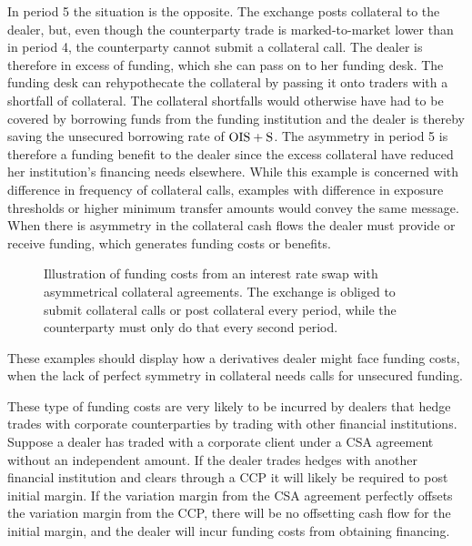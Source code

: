 \documentclass[main.tex]{subfiles}
\begin{document}
\begin{example}
        In period 5 the situation is the opposite.
        The exchange posts collateral to the dealer, 
        but, even though the counterparty trade is marked-to-market lower than in period 4,
        the counterparty cannot submit a collateral call. 
        The dealer is therefore in excess of funding,
        which she can pass on to her funding desk.
        The funding desk can rehypothecate the collateral
        by passing it onto traders with a shortfall of collateral.
        The collateral shortfalls would otherwise have had to be covered by borrowing funds 
        from the funding institution and the dealer is thereby saving the unsecured borrowing rate of $\OIS/ + \text{S}$.
        The asymmetry in period 5 is therefore a funding benefit to the dealer
        since the excess collateral have reduced her institution's financing needs elsewhere.
        While this example is concerned with difference in frequency of collateral calls,
        examples with difference in exposure thresholds or higher minimum transfer amounts 
        would convey the same message.
        When there is asymmetry in the collateral cash flows the dealer must provide or receive funding,
        which generates funding costs or benefits.
        \end{example}

        \begin{figure}
            \centering
            \resizebox{\textwidth}{!}{%
            \begin{tikzpicture}
                
            \end{tikzpicture}        
            }   
            \caption{
                Illustration of funding costs from an interest rate swap with asymmetrical collateral agreements.
                The exchange is obliged to submit collateral calls or post collateral every period,
                while the counterparty must only do that every second period.
            }
            \label{fig:funding-costs-asymmetrical-csa}
        \end{figure}

        These examples should display how a derivatives dealer might face funding costs,
        when the lack of perfect symmetry in collateral needs calls for unsecured funding.

        These type of funding costs are very likely to be incurred by dealers that hedge 
        trades with corporate counterparties by trading with other financial institutions.
        Suppose a dealer has traded with a corporate client
        under a CSA agreement without an independent amount.
        If the dealer trades hedges with another financial institution
        and clears through a CCP it will likely be required to post initial margin. 
        If the variation margin from the CSA agreement 
        perfectly offsets the variation margin from the CCP, 
        there will be no offsetting cash flow for the initial margin,
        and the dealer will incur funding costs from obtaining financing.
        
\end{document}
